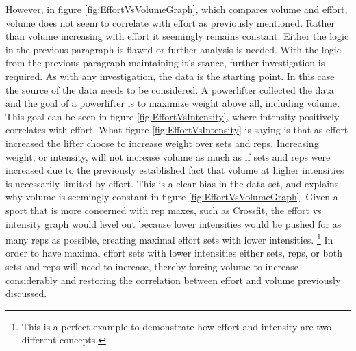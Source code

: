 However, in figure \ref{fig:EffortVsVolumeGraph}, which compares volume and effort, volume does not seem to correlate with effort as previously mentioned. Rather than volume increasing with effort it seemingly remains constant. Either the logic in the previous paragraph is flawed or further analysis is needed. With the logic from the previous paragraph maintaining it's stance, further investigation is required. As with any investigation, the data is the starting point. In this case the source of the data needs to be considered. A powerlifter collected the data and the goal of a powerlifter is to maximize weight above all, including volume. This goal can be seen in figure \ref{fig:EffortVsIntensity}, where intensity positively correlates with effort. What figure \ref{fig:EffortVsIntensity} is saying is that as effort increased the lifter choose to increase weight over sets and reps. Increasing weight, or intensity, will not increase volume as much as if sets and reps were increased due to the previously established fact that volume at higher intensities is necessarily limited by effort. This is a clear bias in the data set, and explains why volume is seemingly constant in figure \ref{fig:EffortVsVolumeGraph}. Given a sport that is more concerned with rep maxes, such as Crossfit, the effort vs intensity graph would level out because lower intensities would be pushed for as many reps as possible, creating maximal effort sets with lower intensities. \footnote{This is a perfect example to demonstrate how effort and intensity are two different concepts.} In order to have maximal effort sets with lower intensities either sets, reps, or both sets and reps will need to increase, thereby forcing volume to increase considerably and restoring the correlation between effort and volume previously discussed.



